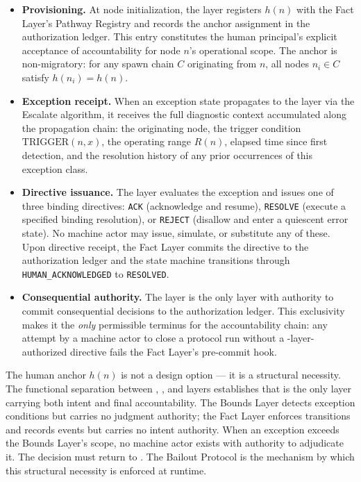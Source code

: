 \begin{itemize}\itemsep=0pt
\item[(\textit{i})] \textbf{Provisioning.} At node initialization, the \purpose{} layer registers $h(n)$ with the Fact Layer's Pathway Registry and records the anchor assignment in the authorization ledger. This entry constitutes the human principal's explicit acceptance of accountability for node $n$'s operational scope. The anchor is non-migratory: for any spawn chain $C$ originating from $n$, all nodes $n_i \in C$ satisfy $h(n_i) = h(n)$.

\item[(\textit{ii})] \textbf{Exception receipt.} When an exception state propagates to the \purpose{} layer via the Escalate algorithm, it receives the full diagnostic context accumulated along the propagation chain: the originating node, the trigger condition $\mathrm{TRIGGER}(n, x)$, the operating range $R(n)$, elapsed time since first detection, and the resolution history of any prior occurrences of this exception class.

\item[(\textit{iii})] \textbf{Directive issuance.} The \purpose{} layer evaluates the exception and issues one of three binding directives: \texttt{ACK} (acknowledge and resume), \texttt{RESOLVE} (execute a specified binding resolution), or \texttt{REJECT} (disallow and enter a quiescent error state). No machine actor may issue, simulate, or substitute any of these. Upon directive receipt, the Fact Layer commits the directive to the authorization ledger and the state machine transitions through \texttt{HUMAN\_ACKNOWLEDGED} to \texttt{RESOLVED}.

\item[(\textit{iv})] \textbf{Consequential authority.} The \purpose{} layer is the only layer with authority to commit consequential decisions to the authorization ledger. This exclusivity makes it the \emph{only} permissible terminus for the accountability chain: any attempt by a machine actor to close a protocol run without a \purpose-layer-authorized directive fails the Fact Layer's pre-commit hook.
\end{itemize}

The human anchor $h(n)$ is not a design option — it is a structural necessity. The functional separation between \purpose{}, \bounds{}, and \fact{} layers establishes that \purpose{} is the only layer carrying both intent and final accountability. The Bounds Layer detects exception conditions but carries no judgment authority; the Fact Layer enforces transitions and records events but carries no intent authority. When an exception exceeds the Bounds Layer's scope, no machine actor exists with authority to adjudicate it. The decision must return to \purpose{}. The Bailout Protocol is the mechanism by which this structural necessity is enforced at runtime.


